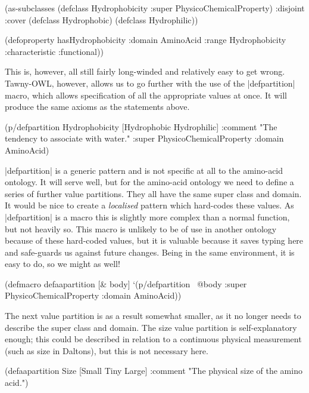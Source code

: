 \begin{tawnyexample}
(as-subclasses
    (defclass Hydrophobicity :super PhysicoChemicalProperty)
  :disjoint :cover
  (defclass Hydrophobic)
  (defclass Hydrophilic))

(defoproperty hasHydrophobicity :domain AminoAcid
   :range Hydrophobicity :characteristic :functional))
\end{tawnyexample}

This is, however, all still fairly long-winded and relatively easy to
get wrong.  Tawny-OWL, however, allows us to go further with the use
of the |defpartition| macro, which allows specification of all the
appropriate values at once. It will produce the same axioms as the
statements above.

\begin{tawny}
(p/defpartition Hydrophobicity
  [Hydrophobic Hydrophilic]
  :comment "The tendency to associate with water."
  :super PhysicoChemicalProperty
  :domain AminoAcid)
\end{tawny}

|defpartition| is a generic pattern and is not specific at all to the
amino-acid ontology. It will serve well, but for the amino-acid
ontology we need to define a series of further value partitions. They
all have the same super class and domain. It would be nice to create a
\emph{localised} pattern which hard-codes these values. As
|defpartition| is a macro this is slightly more complex than a normal
function, but not heavily so. This macro is unlikely to be of use in
another ontology because of these hard-coded values, but it is
valuable because it saves typing here and safe-guards us against
future changes. Being in the same environment, it is easy to do, so we
might as well!

\begin{tawny}
(defmacro defaapartition [& body]
  `(p/defpartition
     ~@body :super PhysicoChemicalProperty
     :domain AminoAcid))
\end{tawny}

The next value partition is as a result somewhat smaller, as it no
longer needs to describe the super class and domain. The size value
partition is self-explanatory enough; this could be described in
relation to a continuous physical measurement (such as size in
Daltons), but this is not necessary here.

\begin{tawny}
(defaapartition Size
  [Small Tiny Large]
  :comment "The physical size of the amino acid.")
\end{tawny}

